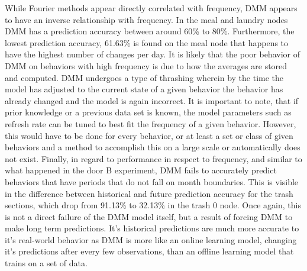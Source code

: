 While Fourier methods appear directly correlated with frequency, DMM
appears to have an inverse relationship with frequency. In the meal and
laundry nodes DMM has a prediction accuracy between around 60\% to 80\%.
Furthermore, the lowest prediction accuracy, 61.63\% is found on the meal
node that happens to have the highest number of changes per day. It is likely
that the poor behavior of DMM on behaviors with high frequency is due to
how the averages are stored and computed. DMM undergoes a type of
thrashing wherein by the time the model has adjusted to the current state of a given
behavior the behavior has already changed and the model is again incorrect. It is important to note, that if prior knowledge
or a previous data set is known, the model parameters such as refresh rate
can be tuned to best fit the frequency of a given behavior.
However, this would have to be done for every behavior, or at least a set or class
of given behaviors and a method to accomplish this on a large scale or automatically does not exist. Finally, in regard to performance in
respect to frequency, and similar to what happened in the door B experiment,
DMM fails to accurately predict behaviors that have periods that do not
fall on month boundaries. This is visible in the difference between historical
and future prediction accuracy for the trash sections, which drop from
91.13\% to 32.13\% in the trash 0 node. Once again, this is not a direct failure
of the DMM model itself, but a result of forcing DMM to make long
term predictions. It's historical predictions are much more accurate to it's
real-world behavior as DMM is more like
an online learning model, changing it's predictions after every few observations,
than an offline learning model that trains on a set of data. \\




\begin{table}[htb!]
  \centering
  \caption{Hallway Delivery Section}
  \label{table:Hallway_Delivery_Section}
\end{table}

